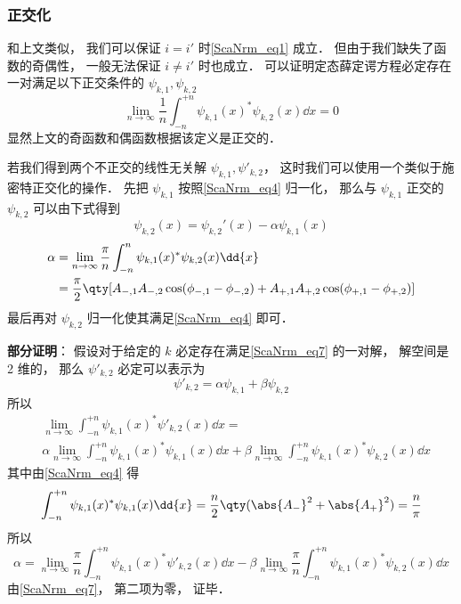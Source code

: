 \subsubsection{正交化}
和上文类似， 我们可以保证 $i = i'$ 时\autoref{ScaNrm_eq1} 成立． 但由于我们缺失了函数的奇偶性， 一般无法保证 $i \ne i'$ 时也成立． 可以证明定态薛定谔方程必定存在一对满足以下正交条件的 $\psi_{k,1}, \psi_{k,2}$
\begin{equation}\label{ScaNrm_eq7}
\lim_{n\to\infty}\frac{1}{n}\int_{-n}^{+n} \psi_{k,1}(x)^* \psi_{k,2}(x) \dd{x} = 0
\end{equation}
显然上文的奇函数和偶函数根据该定义是正交的．

若我们得到两个不正交的线性无关解 $\psi_{k,1}, \psi'_{k,2}$， 这时我们可以使用一个类似于施密特正交化的操作． 先把 $\psi_{k,1}$ 按照\autoref{ScaNrm_eq4} 归一化， 那么与 $\psi_{k,1}$ 正交的 $\psi_{k,2}$ 可以由下式得到
\begin{equation}
\psi_{k,2}(x) = \psi_{k,2}'(x) - \alpha \psi_{k,1}(x)
\end{equation}
\begin{equation}\label{ScaNrm_eq5}
\begin{aligned}
\alpha &= \lim_{n\to\infty} \frac{\pi}{n} \int_{-n}^n \psi_{k,1}(x)^* \psi_{k,2}(x) \dd{x}\\
&= \frac{\pi}{2} \qty[A_{-,1}A_{-,2}\cos(\phi_{-,1}-\phi_{-,2}) + A_{+,1}A_{+,2}\cos(\phi_{+,1}-\phi_{+,2})]
\end{aligned}
\end{equation}
最后再对 $\psi_{k,2}$ 归一化使其满足\autoref{ScaNrm_eq4} 即可．

\textbf{部分证明}： 假设对于给定的 $k$ 必定存在满足\autoref{ScaNrm_eq7} 的一对解， 解空间是 2 维的， 那么 $\psi'_{k,2}$ 必定可以表示为
\begin{equation}
\psi'_{k,2} = \alpha\psi_{k,1} + \beta\psi_{k,2}
\end{equation}
所以
\begin{equation}
\begin{aligned}
&\lim_{n\to\infty}\int_{-n}^{+n} \psi_{k,1}(x)^*\psi'_{k,2}(x)\dd{x}
=\\
&\alpha\lim_{n\to\infty}\int_{-n}^{+n} \psi_{k,1}(x)^*\psi_{k,1}(x)\dd{x}
+ \beta\lim_{n\to\infty}\int_{-n}^{+n} \psi_{k,1}(x)^*\psi_{k,2}(x)\dd{x}
\end{aligned}
\end{equation}
其中由\autoref{ScaNrm_eq4} 得
\begin{equation}
\int_{-n}^{+n} \psi_{k,1}(x)^*\psi_{k,1}(x)\dd{x} = \frac{n}{2}\qty(\abs{A_-}^2 + \abs{A_+}^2) = \frac{n}{\pi}
\end{equation}
所以
\begin{equation}
\alpha = \lim_{n\to\infty}\frac{\pi}{n}\int_{-n}^{+n} \psi_{k,1}(x)^*\psi'_{k,2}(x)\dd{x} - \beta\lim_{n\to\infty}\frac{\pi}{n}\int_{-n}^{+n} \psi_{k,1}(x)^*\psi_{k,2}(x)\dd{x}
\end{equation}
由\autoref{ScaNrm_eq7}， 第二项为零， 证毕．

